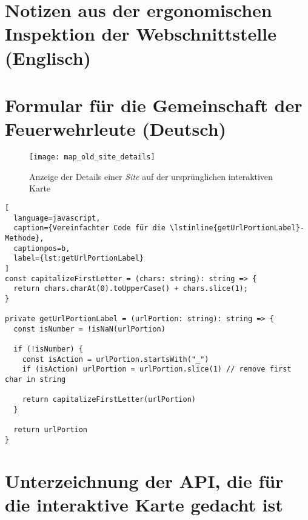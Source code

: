 



\section{Notizen aus der ergonomischen Inspektion der Webschnittstelle (Englisch)} \label{appendix:ergonomic-inspection}



\section{Formular für die Gemeinschaft der Feuerwehrleute (Deutsch)} \label{appendix:firefighter-survey}







\begin{figure}[H]
  \centering
  \texttt{[image: map\_old\_site\_details]}
  \caption{Anzeige der Details einer \textit{Site} auf der ursprünglichen interaktiven Karte}
  \label{fig:map_old_site_details}
\end{figure}



\begin{lstlisting}[
  language=javascript,
  caption={Vereinfachter Code für die \lstinline{getUrlPortionLabel}-Methode},
  captionpos=b,
  label={lst:getUrlPortionLabel}
]
const capitalizeFirstLetter = (chars: string): string => {
  return chars.charAt(0).toUpperCase() + chars.slice(1);
}

private getUrlPortionLabel = (urlPortion: string): string => {
  const isNumber = !isNaN(urlPortion)

  if (!isNumber) {
    const isAction = urlPortion.startsWith("_")
    if (isAction) urlPortion = urlPortion.slice(1) // remove first char in string

    return capitalizeFirstLetter(urlPortion)
  }

  return urlPortion
}
\end{lstlisting}

\section{Unterzeichnung der API, die für die interaktive Karte gedacht ist} \label{appendix:map-api}
